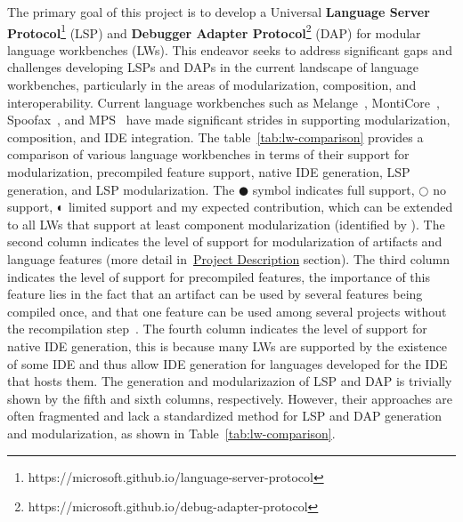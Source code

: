 The primary goal of this project is to develop a Universal \textbf{Language Server Protocol}\footnote{https://microsoft.github.io/language-server-protocol} (LSP) and \textbf{Debugger Adapter Protocol}\footnote{https://microsoft.github.io/debug-adapter-protocol} (DAP) for modular language workbenches (LWs). This endeavor seeks to address significant gaps and challenges developing LSPs and DAPs in the current landscape of language workbenches, particularly in the areas of modularization, composition, and interoperability. Current language workbenches such as Melange~\cite{Degueule15}, MontiCore~\cite{Krahn10}, Spoofax~\cite{Visser10}, and MPS~\cite{Volter11, Voelter12} have made significant strides in supporting modularization, composition, and IDE integration.
The table~\ref{tab:lw-comparison} provides a comparison of various language workbenches in terms of their support for modularization, precompiled feature support, native IDE generation, LSP generation, and LSP modularization. The $\CIRCLE$ symbol indicates full support, $\Circle$ no support, $\LEFTcircle$ limited support and \FiveStarConvex my expected contribution, which can be extended to all LWs that support at least component modularization (identified by ).
The second column indicates the level of support for modularization of artifacts and language features (more detail in~\hyperref[project-description]{Project Description} section). The third column indicates the level of support for precompiled features, the importance of this feature lies in the fact that an artifact can be used by several features being compiled once, and that one feature can be used among several projects without the recompilation step~\cite{Leduc20}. The fourth column indicates the level of support for native IDE generation, this is because many LWs are supported by the existence of some IDE and thus allow IDE generation for languages developed for the IDE that hosts them.
The generation and modularizazion of LSP and DAP is trivially shown by the fifth and sixth columns, respectively.
However, their approaches are often fragmented and lack a standardized method for LSP and DAP generation and modularization, as shown in Table~\ref{tab:lw-comparison}.
